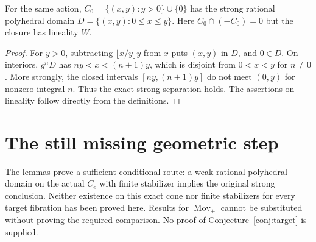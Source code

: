 \begin{proposition}\label{prop:open}
For the same action, $C_0=\{(x,y):y>0\}\cup\{0\}$ has the strong rational polyhedral domain $D=\{(x,y):0\leq x\leq y\}$. Here $C_0\cap(-C_0)=0$ but the closure has lineality $W$.
\end{proposition}
\begin{proof}
For $y>0$, subtracting $\lfloor x/y\rfloor y$ from $x$ puts $(x,y)$ in $D$, and $0\in D$. On interiors, $g^nD$ has $ny<x<(n+1)y$, which is disjoint from $0<x<y$ for $n\neq0$. More strongly, the closed intervals $[ny,(n+1)y]$ do not meet $(0,y)$ for nonzero integral $n$. Thus the exact strong separation holds. The assertions on lineality follow directly from the definitions.
\end{proof}

\section{The still missing geometric step}
The lemmas prove a sufficient conditional route: a weak rational polyhedral domain on the actual $C_e$ with finite stabilizer implies the original strong conclusion. Neither existence on this exact cone nor finite stabilizers for every target fibration has been proved here. Results for $\operatorname{Mov}_{+}$ cannot be substituted without proving the required comparison. No proof of Conjecture~\ref{conj:target} is supplied.
